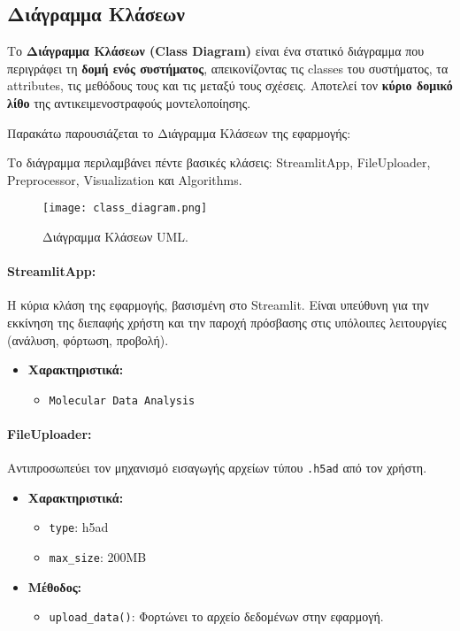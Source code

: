 \documentclass{article}  %
\begin{document}
\subsection{Διάγραμμα Κλάσεων}

Το \textbf{Διάγραμμα Κλάσεων (Class Diagram)} είναι ένα στατικό διάγραμμα που περιγράφει τη \textbf{δομή ενός συστήματος}, απεικονίζοντας τις classes του συστήματος, τα attributes, τις μεθόδους τους και τις μεταξύ τους σχέσεις. Αποτελεί τον \textbf{κύριο δομικό λίθο} της αντικειμενοστραφούς μοντελοποίησης.

\noindent Παρακάτω παρουσιάζεται το Διάγραμμα Κλάσεων της εφαρμογής:

Το διάγραμμα περιλαμβάνει πέντε βασικές κλάσεις: StreamlitApp, FileUploader, Preprocessor, Visualization και Algorithms.

\vspace{1em}

\begin{figure}[ht!]
    \centering
    \texttt{[image: class\_diagram.png]}
    \caption{Διάγραμμα Κλάσεων UML.}
\end{figure}

\vspace{1em}

\paragraph{StreamlitApp:}
Η κύρια κλάση της εφαρμογής, βασισμένη στο Streamlit. Είναι υπεύθυνη για την εκκίνηση της διεπαφής χρήστη και την παροχή πρόσβασης στις υπόλοιπες λειτουργίες (ανάλυση, φόρτωση, προβολή).
\begin{itemize}
  \item \textbf{Χαρακτηριστικά:}
  \begin{itemize}
    \item \texttt{Molecular Data Analysis}
  \end{itemize}
\end{itemize}

\paragraph{FileUploader:}
Αντιπροσωπεύει τον μηχανισμό εισαγωγής αρχείων τύπου \texttt{.h5ad} από τον χρήστη.
\begin{itemize}
  \item \textbf{Χαρακτηριστικά:}
  \begin{itemize}
    \item \texttt{type}: h5ad
    \item \texttt{max\_size}: 200MB
  \end{itemize}
  \item \textbf{Μέθοδος:}
  \begin{itemize}
    \item \texttt{upload\_data()}: Φορτώνει το αρχείο δεδομένων στην εφαρμογή.
  \end{itemize}
\end{itemize}
\end{document}
